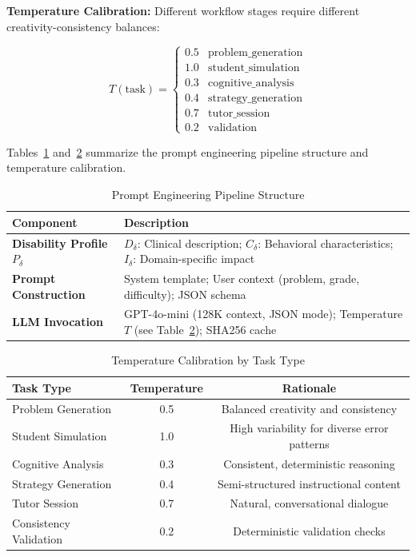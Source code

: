 \documentclass[11pt]{article}
\begin{document}
\textbf{Temperature Calibration:} Different workflow stages require different creativity-consistency balances:

\begin{equation}
T(\text{task}) = \begin{cases}
0.5 & \text{problem\_generation} \\
1.0 & \text{student\_simulation} \\
0.3 & \text{cognitive\_analysis} \\
0.4 & \text{strategy\_generation} \\
0.7 & \text{tutor\_session} \\
0.2 & \text{validation}
\end{cases}
\label{eq:temperature}
\end{equation}

Tables~\ref{tab:prompt-engineering} and~\ref{tab:temperature} summarize the prompt engineering pipeline structure and temperature calibration.

\begin{table}[H]
\centering
\caption{Prompt Engineering Pipeline Structure}
\label{tab:prompt-engineering}
\footnotesize
\begin{tabular}{p{2cm}p{6cm}}
\toprule
\textbf{Component} & \textbf{Description} \\
\midrule
\textbf{Disability Profile} $P_\delta$ & 
$D_\delta$: Clinical description; $C_\delta$: Behavioral characteristics; $I_\delta$: Domain-specific impact \\
\addlinespace
\textbf{Prompt Construction} & 
System template; User context (problem, grade, difficulty); JSON schema \\
\addlinespace
\textbf{LLM Invocation} & 
GPT-4o-mini (128K context, JSON mode); Temperature $T$ (see Table~\ref{tab:temperature}); SHA256 cache \\
\bottomrule
\end{tabular}
\end{table}

\begin{table}[H]
\centering
\caption{Temperature Calibration by Task Type}
\label{tab:temperature}
\begin{tabular}{lcc}
\toprule
\textbf{Task Type} & \textbf{Temperature} & \textbf{Rationale} \\
\midrule
Problem Generation & 0.5 & Balanced creativity and consistency \\
Student Simulation & 1.0 & High variability for diverse error patterns \\
Cognitive Analysis & 0.3 & Consistent, deterministic reasoning \\
Strategy Generation & 0.4 & Semi-structured instructional content \\
Tutor Session & 0.7 & Natural, conversational dialogue \\
Consistency Validation & 0.2 & Deterministic validation checks \\
\bottomrule
\end{tabular}
\end{table}
\end{document}
